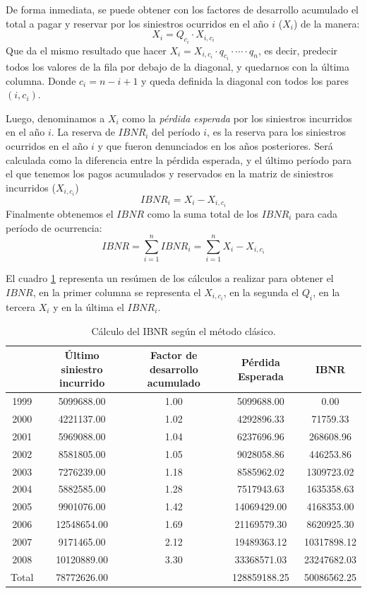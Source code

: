 \documentclass[
  12pt,
]{article}
\begin{document}
De forma inmediata, se puede obtener con los factores de desarrollo
acumulado el total a pagar y reservar por los siniestros ocurridos en el
año \(i\) (\(X_i\)) de la manera: \[
X_i = Q_{c_i} \cdot X_{i,c_i}
\] Que da el mismo resultado que hacer
\(X_i = X_{i,c_i} \cdot q_{c_i} \cdot \cdots \cdot q_{n}\), es decir,
predecir todos los valores de la fila por debajo de la diagonal, y
quedarnos con la última columna. Donde \(c_i = n-i+1\) y queda definida
la diagonal con todos los pares \((i,c_i)\).

Luego, denominamos a \(X_i\) como la \emph{pérdida esperada} por los
siniestros incurridos en el año \(i\). La reserva de \(IBNR_i\) del
período \(i\), es la reserva para los siniestros ocurridos en el año
\(i\) y que fueron denunciados en los años posteriores. Será calculada
como la diferencia entre la pérdida esperada, y el último período para
el que tenemos los pagos acumulados y reservados en la matriz de
siniestros incurridos (\(X_{i,c_i}\)) \[
IBNR_i = X_i - X_{i,c_i} 
\] Finalmente obtenemos el \(IBNR\) como la suma total de los \(IBNR_i\)
para cada período de ocurrencia: \[
IBNR = \sum_{i=1}^n IBNR_i = \sum_{i=1}^n X_i - X_{i,c_i} 
\]

El cuadro \ref{exhibit} representa un resúmen de los cálculos a realizar
para obtener el \(IBNR\), en la primer columna se representa el
\(X_{i,c_i}\), en la segunda el \(Q_i\), en la tercera \(X_i\) y en la
última el \(IBNR_i\).

\begin{table}[ht]
\centering
\caption{Cálculo del IBNR según el método clásico.} 
\label{exhibit}
\begingroup\fontsize{10pt}{10pt}\selectfont
\begin{tabular}{ccccc}
  \hline
 & Último siniestro incurrido & Factor de desarrollo acumulado & Pérdida Esperada & IBNR \\ 
  \hline
1999 & 5099688.00 & 1.00 & 5099688.00 & 0.00 \\ 
  2000 & 4221137.00 & 1.02 & 4292896.33 & 71759.33 \\ 
  2001 & 5969088.00 & 1.04 & 6237696.96 & 268608.96 \\ 
  2002 & 8581805.00 & 1.05 & 9028058.86 & 446253.86 \\ 
  2003 & 7276239.00 & 1.18 & 8585962.02 & 1309723.02 \\ 
  2004 & 5882585.00 & 1.28 & 7517943.63 & 1635358.63 \\ 
  2005 & 9901076.00 & 1.42 & 14069429.00 & 4168353.00 \\ 
  2006 & 12548654.00 & 1.69 & 21169579.30 & 8620925.30 \\ 
  2007 & 9171465.00 & 2.12 & 19489363.12 & 10317898.12 \\ 
  2008 & 10120889.00 & 3.30 & 33368571.03 & 23247682.03 \\ 
  Total & 78772626.00 &  & 128859188.25 & 50086562.25 \\ 
   \hline
\end{tabular}
\endgroup
\end{table}
\end{document}
